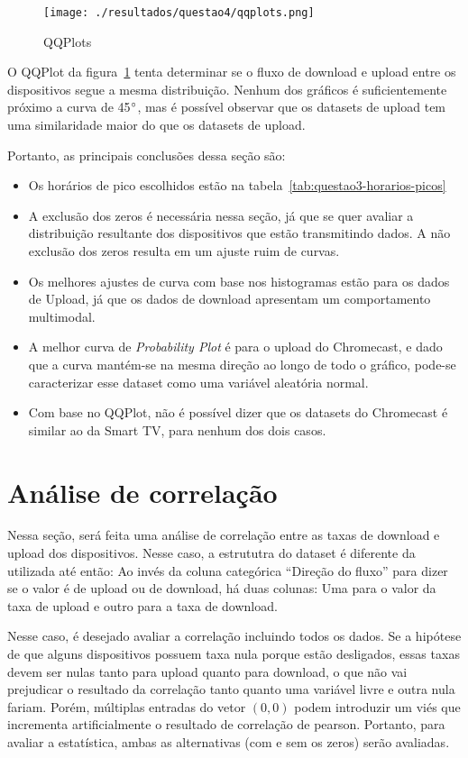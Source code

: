 \documentclass{article}
\begin{document}
\begin{figure}[h]
	\centering
	\caption{QQPlots}
	\texttt{[image: ./resultados/questao4/qqplots.png]}
	\label{fig:qqplot}
\end{figure}

O QQPlot da figura~\ref{fig:qqplot} tenta determinar se o fluxo de download e upload entre os dispositivos segue a mesma distribuição. Nenhum dos gráficos é suficientemente próximo a curva de 45$\degree$, mas é possível observar que os datasets de upload tem uma similaridade maior do que os datasets de upload.

Portanto, as principais conclusões dessa seção são:
\begin{itemize}
	\item Os horários de pico escolhidos estão na tabela~\ref{tab:questao3-horarios-picos}
	\item A exclusão dos zeros é necessária nessa seção, já que se quer avaliar a distribuição resultante dos dispositivos que estão transmitindo dados. A não exclusão dos zeros resulta em um ajuste ruim de curvas.
	\item Os melhores ajustes de curva com base nos histogramas estão para os dados de Upload, já que os dados de download apresentam um comportamento multimodal.
	\item A melhor curva de \textit{Probability Plot} é para o upload do Chromecast, e dado que a curva mantém-se na mesma direção ao longo de todo o gráfico, pode-se caracterizar esse dataset como uma variável aleatória normal.
	\item Com base no QQPlot, não é possível dizer que os datasets do Chromecast é similar ao da Smart TV, para nenhum dos dois casos.
\end{itemize}


\section{Análise de correlação}

Nessa seção, será feita uma análise de correlação entre as taxas de download e upload dos dispositivos. Nesse caso, a estrututra do dataset é diferente da utilizada até então: Ao invés da coluna categórica ``Direção do fluxo'' para dizer se o valor é de upload ou de download, há duas colunas: Uma para o valor da taxa de upload e outro para a taxa de download.

Nesse caso, é desejado avaliar a correlação incluindo todos os dados. Se a hipótese de que alguns dispositivos possuem taxa nula porque estão desligados, essas taxas devem ser nulas tanto para upload quanto para download, o que não vai prejudicar o resultado da correlação tanto quanto uma variável livre e outra nula fariam. Porém, múltiplas entradas do vetor $(0,0)$ podem introduzir um viés que incrementa artificialmente o resultado de correlação de pearson. Portanto, para avaliar a estatística, ambas as alternativas (com e sem os zeros) serão avaliadas.
\end{document}
